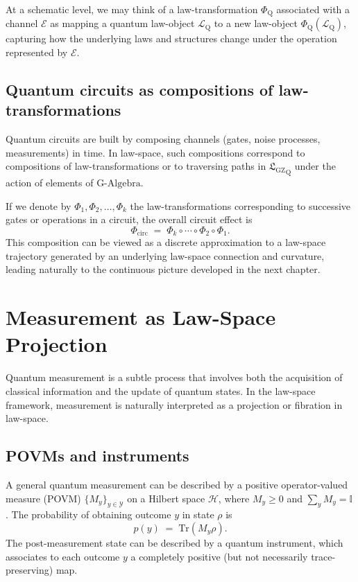 \documentclass[11pt]{book}
\newcommand{\GAlgebra}{\text{G-Algebra}}
\newcommand{\GZLS}{\ensuremath{\mathfrak{L}_{\mathrm{GZ}}}}
\theoremstyle{plain}
\theoremstyle{definition}
\theoremstyle{remark}
\begin{document}
At a schematic level, we may think of a law-transformation
$\Phi_{\mathrm{Q}}$ associated with a channel $\mathcal{E}$ as
mapping a quantum law-object $\mathcal{L}_{\mathrm{Q}}$ to a new
law-object $\Phi_{\mathrm{Q}}(\mathcal{L}_{\mathrm{Q}})$, capturing
how the underlying laws and structures change under the operation
represented by $\mathcal{E}$.

\subsection*{Quantum circuits as compositions of law-transformations}

Quantum circuits are built by composing channels (gates, noise
processes, measurements) in time. In law-space, such compositions
correspond to compositions of law-transformations or to traversing
paths in ${\GZLS}_{\mathrm{Q}}$ under the action of elements of
$\GAlgebra$.

If we denote by $\Phi_1,\Phi_2,\dots,\Phi_k$ the law-transformations
corresponding to successive gates or operations in a circuit, the
overall circuit effect is
\[
   \Phi_{\mathrm{circ}}
   \;=\;
   \Phi_k \circ \cdots \circ \Phi_2 \circ \Phi_1.
\]
This composition can be viewed as a discrete approximation to a
law-space trajectory generated by an underlying law-space connection
and curvature, leading naturally to the continuous picture developed
in the next chapter.

\section{Measurement as Law-Space Projection}
\label{sec:measurement-lawspace-projection}


Quantum measurement is a subtle process that involves both the
acquisition of classical information and the update of quantum
states. In the law-space framework, measurement is naturally
interpreted as a projection or fibration in law-space.

\subsection*{POVMs and instruments}

A general quantum measurement can be described by a positive
operator-valued measure (POVM) $\{M_y\}_{y\in\mathcal{Y}}$ on a
Hilbert space $\mathcal{H}$, where $M_y \ge 0$ and
$\sum_{y} M_y = \mathbb{I}$. The probability of obtaining outcome
$y$ in state $\rho$ is
\[
   p(y) \;=\; \mathrm{Tr}(M_y \rho).
\]
The post-measurement state can be described by a quantum instrument,
which associates to each outcome $y$ a completely positive (but not
necessarily trace-preserving) map.
\end{document}
